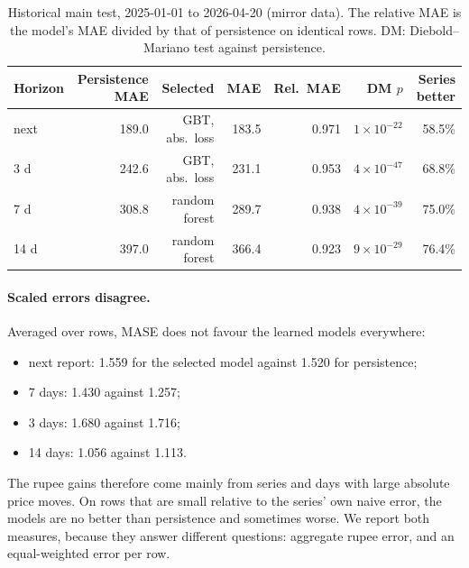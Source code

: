 \begin{table}[t]\centering\small
\caption{Historical main test, 2025-01-01 to 2026-04-20 (mirror data). The relative MAE is the model's MAE divided by that of persistence on identical rows. DM: Diebold--Mariano test against persistence.}\label{tab:main}
\begin{tabular}{@{}lrrrrrr@{}}\toprule
Horizon & Persistence MAE & Selected & MAE & Rel.\ MAE & DM $p$ & Series better\\\midrule
next & 189.0 & GBT, abs.\ loss & 183.5 & 0.971 & $1\times10^{-22}$ & 58.5\%\\
3 d & 242.6 & GBT, abs.\ loss & 231.1 & 0.953 & $4\times10^{-47}$ & 68.8\%\\
7 d & 308.8 & random forest & 289.7 & 0.938 & $4\times10^{-39}$ & 75.0\%\\
14 d & 397.0 & random forest & 366.4 & 0.923 & $9\times10^{-29}$ & 76.4\%\\\bottomrule
\end{tabular}\end{table}

\paragraph{Scaled errors disagree.}
Averaged over rows, MASE does not favour the learned models everywhere:
\begin{itemize}
  \item next report: 1.559 for the selected model against 1.520 for persistence;
  \item 7 days: 1.430 against 1.257;
  \item 3 days: 1.680 against 1.716;
  \item 14 days: 1.056 against 1.113.
\end{itemize}
The rupee gains therefore come mainly from series and days with large absolute price moves. On rows that are small relative to the series' own naive error, the models are no better than persistence and sometimes worse.
We report both measures, because they answer different questions: aggregate rupee error, and an equal-weighted error per row.

